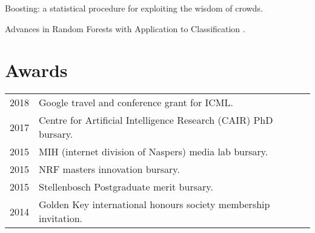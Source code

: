 \documentclass[]{deedy-resume-openfont}
\begin{document}
\begin{minipage}[t]{0.66\textwidth}

\descript{}
\begin{tightemize}
\item Boosting: a statistical procedure for exploiting the wisdom of crowds.
\item Advances in Random Forests with Application to Classification \href{http://ir.nrf.ac.za/bitstream/handle/10907/912/pretorius_advances_2016.pdf?sequence=1}{\custombold{[link]}}.
\end{tightemize}
\sectionsep



\section{Awards} 
\begin{tabular}{rll}
2018		& Google travel and conference grant for ICML.\\
2017		& Centre for Artificial Intelligence Research (CAIR) PhD bursary.\\
2015	    & MIH (internet division of Naspers) media lab bursary.\\
2015	    & NRF masters innovation bursary.\\
2015	    & Stellenbosch Postgraduate merit bursary.\\
2014     	& Golden Key international honours society membership invitation. \\
\end{tabular}
\sectionsep



\end{minipage}
\end{document}
